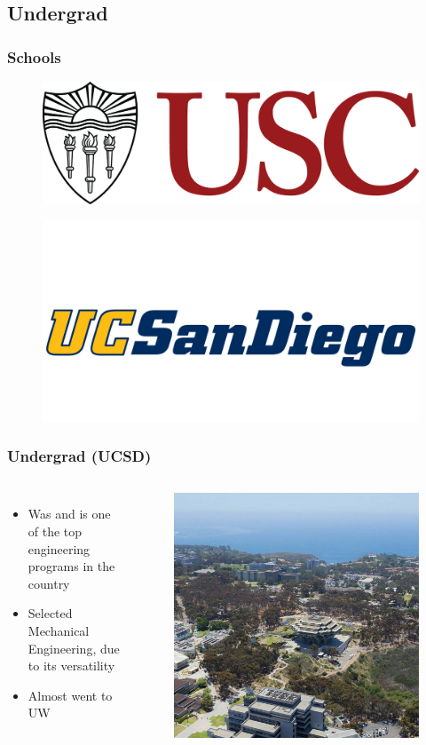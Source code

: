 \documentclass[aspectratio=169]{beamer}
\begin{document}
\subsection{Undergrad}
\begin{frame}
  \frametitle{Schools}
  \begin{figure}
    \includegraphics[width=0.35\linewidth]{USC_Logo.png}
  \end{figure}

  \begin{figure}
    \includegraphics[width=0.35\linewidth]{ucsd-athletics-logo.png}
  \end{figure}
\end{frame}

\begin{frame}
  \frametitle{Undergrad (UCSD)}
  \begin{columns}[t]            %
  \begin{itemize}
  \item Was and is one of the top engineering programs in the country
  \item Selected Mechanical Engineering, due to its versatility
  \item Almost went to UW
  \end{itemize}

  \begin{figure}
    \includegraphics[width=0.7\linewidth]{UCSD.jpg}
  \end{figure}
  \end{columns}
\end{frame}
\end{document}
